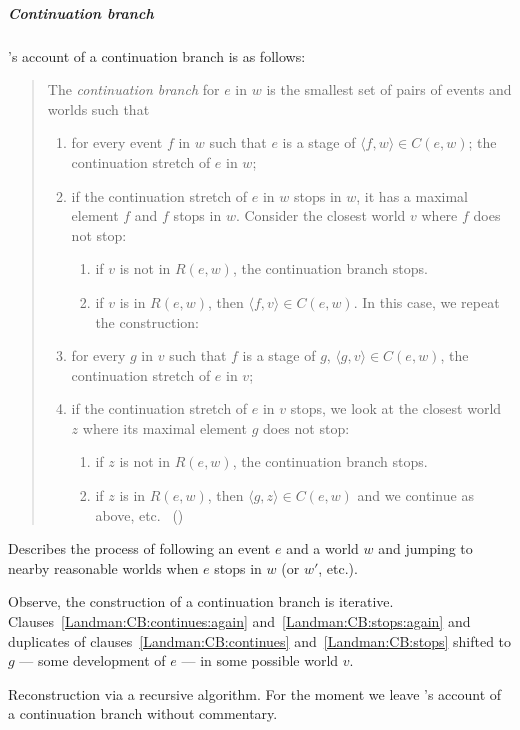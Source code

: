 \subparagraph{Continuation branch}

\begin{note}
  \citeauthor{Landman:1992wh}'s account of a continuation branch is as follows:
  \begin{quote}
    The \emph{continuation branch} for \(e\) in \(w\) is the smallest set of pairs of events and worlds such that
    \begin{enumerate}
    \item
      \label{Landman:CB:continues}
      for every event \(f\) in \(w\) such that \(e\) is a stage of \(\langle f,w \rangle \in C(e,w)\);
      the continuation stretch of \(e\) in \(w\);
    \item
      \label{Landman:CB:stops}
      if the continuation stretch of \(e\) in \(w\) stops in \(w\), it has a maximal element \(f\) and \(f\) stops in \(w\).
      Consider the closest world \(v\) where \(f\) does not stop:
      \begin{enumerate}[label=--]
      \item
        if \(v\) is not in \(R(e, w)\), the continuation branch stops.
      \item
        if \(v\) is in \(R(e, w)\), then \(\langle f,v \rangle \in C(e,w)\).
        In this case, we repeat the construction:
      \end{enumerate}
    \item
      \label{Landman:CB:continues:again}
      for every \(g\) in \(v\) such that \(f\) is a stage of \(g\), \(\langle g,v \rangle \in C(e,w)\), the continuation stretch of \(e\) in \(v\);
    \item
      \label{Landman:CB:stops:again}
      if the continuation stretch of \(e\) in \(v\) stops, we look at the closest world \(z\) where its maximal element \(g\) does not stop:
      \begin{enumerate}[label=--]
      \item
        if \(z\) is not in \(R(e, w)\), the continuation branch stops.
      \item
        if \(z\) is in \(R(e, w)\), then \(\langle g,z \rangle \in C(e,w)\) and we continue as above, etc.%
        \mbox{ }\hfill\mbox{(\citeyear[26--27]{Landman:1992wh})}
      \end{enumerate}
    \end{enumerate}
  \end{quote}

  Describes the process of following an event \(e\) and a world \(w\) and jumping to nearby reasonable worlds when \(e\) stops in \(w\) (or \(w'\), etc.).

  Observe, the construction of a continuation branch is iterative.
  Clauses~\ref{Landman:CB:continues:again} and~\ref{Landman:CB:stops:again} and duplicates of clauses~\ref{Landman:CB:continues} and~\ref{Landman:CB:stops} shifted to \(g\) --- some development of \(e\) --- in some possible world \(v\).

  Reconstruction via a recursive algorithm.
  For the moment we leave \citeauthor{Landman:1992wh}'s account of a continuation branch without commentary.
\end{note}

